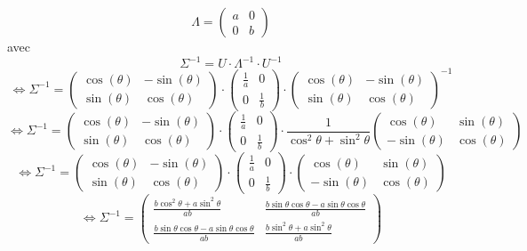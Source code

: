 \documentclass{article}
\begin{document}
\[
\Lambda = \begin{pmatrix}
    a & 0 \\
    0 & b
\end{pmatrix}
\]
avec 
$$ \Sigma^{-1} = U \cdot \Lambda^{-1} \cdot U^{-1}$$
$$\Leftrightarrow \Sigma^{-1} = \begin{pmatrix} \cos(\theta) & -\sin(\theta) \\ \sin(\theta) & \cos(\theta) \end{pmatrix} \cdot \begin{pmatrix} \frac{1}{a} & 0 \\ 0 & \frac{1}{b} \end{pmatrix} \cdot \begin{pmatrix} \cos(\theta) & -\sin(\theta) \\ \sin(\theta) & \cos(\theta) \end{pmatrix}^{-1}$$
$$\Leftrightarrow \Sigma^{-1} = \begin{pmatrix} \cos(\theta) & -\sin(\theta) \\ \sin(\theta) & \cos(\theta) \end{pmatrix} \cdot \begin{pmatrix} \frac{1}{a} & 0 \\ 0 & \frac{1}{b} \end{pmatrix} \cdot \frac{1}{\cos^{2} \theta + \sin^{2} \theta}\begin{pmatrix} \cos(\theta) & \sin(\theta) \\ -\sin(\theta) & \cos(\theta) \end{pmatrix}$$
$$\Leftrightarrow \Sigma^{-1} = \begin{pmatrix} \cos(\theta) & -\sin(\theta) \\ \sin(\theta) & \cos(\theta) \end{pmatrix} \cdot \begin{pmatrix} \frac{1}{a} & 0 \\ 0 & \frac{1}{b} \end{pmatrix} \cdot \begin{pmatrix} \cos(\theta) & \sin(\theta) \\ -\sin(\theta) & \cos(\theta) \end{pmatrix}$$
$$\Leftrightarrow \Sigma^{-1} = \begin{pmatrix} \frac{b\cos^{2} \theta + a\sin^{2} \theta}{ab} & \frac{b\sin \theta\cos \theta - a\sin \theta\cos \theta}{ab} \\ \frac{b\sin \theta\cos \theta - a\sin \theta\cos \theta}{ab} & \frac{b\sin^{2} \theta + a\sin^{2} \theta}{ab}\end{pmatrix} $$
\end{document}
